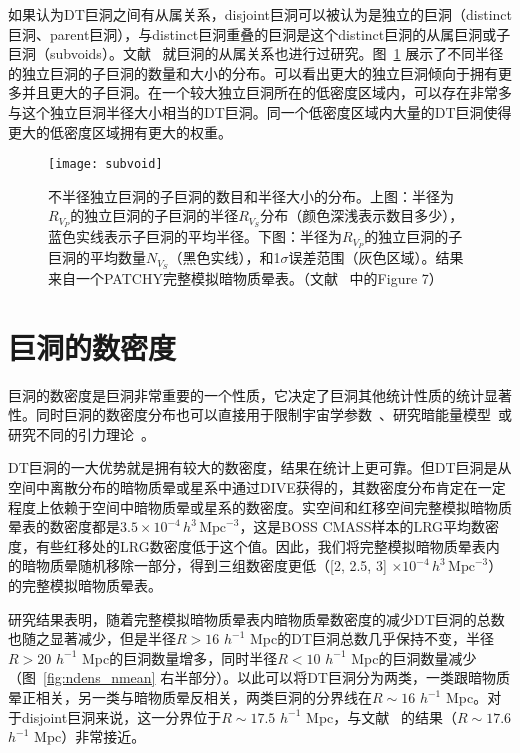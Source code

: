 如果认为DT巨洞之间有从属关系，disjoint巨洞可以被认为是独立的巨洞（distinct巨洞、parent巨洞），与distinct巨洞重叠的巨洞是这个distinct巨洞的从属巨洞或子巨洞（subvoids）。文献 ~就巨洞的从属关系也进行过研究。图~\ref{fig:subvoid} 展示了不同半径的独立巨洞的子巨洞的数量和大小的分布。可以看出更大的独立巨洞倾向于拥有更多并且更大的子巨洞。在一个较大独立巨洞所在的低密度区域内，可以存在非常多与这个独立巨洞半径大小相当的DT巨洞。同一个低密度区域内大量的DT巨洞使得更大的低密度区域拥有更大的权重。

\begin{figure}
\centering
\texttt{[image: subvoid]}
\caption{不半径独立巨洞的子巨洞的数目和半径大小的分布。上图：半径为$R_{V_P}$的独立巨洞的子巨洞的半径$R_{V_S}$分布（颜色深浅表示数目多少），蓝色实线表示子巨洞的平均半径。下图：半径为$R_{V_P}$的独立巨洞的子巨洞的平均数量$N_{V_S}$（黑色实线），和1$\sigma$误差范围（灰色区域）。结果来自一个\textsc{PATCHY}完整模拟暗物质晕表。（文献 ~中的Figure 7）}
\label{fig:subvoid}
\end{figure}

\section{巨洞的数密度}
\label{sec:voidnumberdensity}

巨洞的数密度是巨洞非常重要的一个性质，它决定了巨洞其他统计性质的统计显著性。同时巨洞的数密度分布也可以直接用于限制宇宙学参数~\cite{Patiri2006HB,JLH13}、研究暗能量模型~\cite{Pisani2015PRD,Sutter2015}或研究不同的引力理论~\cite{Cai2015}。

DT巨洞的一大优势就是拥有较大的数密度，结果在统计上更可靠。但DT巨洞是从空间中离散分布的暗物质晕或星系中通过DIVE获得的，其数密度分布肯定在一定程度上依赖于空间中暗物质晕或星系的数密度。实空间和红移空间完整模拟暗物质晕表的数密度都是$3.5\times10^{-4}\,h^{3}\,\mathrm{Mpc}^{-3}$，这是BOSS CMASS样本的LRG平均数密度，有些红移处的LRG数密度低于这个值。因此，我们将完整模拟暗物质晕表内的暗物质晕随机移除一部分，得到三组数密度更低（[2, 2.5, 3] $\times 10^{-4}\,h^3\,\mathrm{Mpc}^{-3}$）的完整模拟暗物质晕表。

研究结果表明，随着完整模拟暗物质晕表内暗物质晕数密度的减少DT巨洞的总数也随之显著减少，但是半径$R > 16$ $h^{-1}$ Mpc的DT巨洞总数几乎保持不变，半径$R > 20$ $h^{-1}$ Mpc的巨洞数量增多，同时半径$R < 10$ $h^{-1}$ Mpc的巨洞数量减少（图~\ref{fig:ndens_nmean} 右半部分）。以此可以将DT巨洞分为两类，一类跟暗物质晕正相关，另一类与暗物质晕反相关，两类巨洞的分界线在$R \sim 16$ $h^{-1}$ Mpc。对于disjoint巨洞来说，这一分界位于$R \sim 17.5$ $h^{-1}$ Mpc，与文献 ~的结果（$R \sim 17.6$ $h^{-1}$ Mpc）非常接近。

